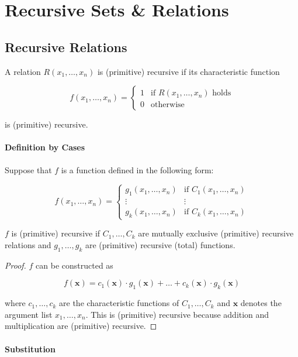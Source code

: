 \section{Recursive Sets \& Relations}

\subsection{Recursive Relations}

A relation $R(x_1, \ldots, x_n)$ is (primitive) recursive if its characteristic 
function

$$f(x_1, \ldots, x_n) = 
    \begin{cases}
        1 & \textrm{if } R(x_1, \ldots, x_n) \textrm{ holds} \\
        0 & \textrm{otherwise}
    \end{cases}
$$

is (primitive) recursive.

\paragraph{Definition by Cases}
Suppose that $f$ is a function defined in the following form:

$$f(x_1, \ldots, x_n) =
    \begin{cases}
        g_1(x_1, \ldots, x_n) & \textrm{if } C_1(x_1, \ldots, x_n) \\
        \vdots & \vdots \\
        g_k(x_1, \ldots, x_n) & \textrm{if } C_k(x_1, \ldots, x_n)
    \end{cases}
$$

$f$ is (primitive) recursive if $C_1, \ldots, C_k$ are mutually exclusive 
(primitive) recursive relations and $g_1, \ldots, g_k$ are (primitive) recursive
(total) functions. 

\begin{proof}
$f$ can be constructed as

$$f(\mathbf{x}) = c_1(\mathbf{x}) \cdot g_1(\mathbf{x}) + \ldots + 
c_k(\mathbf{x}) \cdot g_k(\mathbf{x})$$

where $c_1, \ldots, c_k$ are the characteristic functions of $C_1, \ldots, C_k$ 
and $\mathbf{x}$ denotes the argument list $x_1, \ldots, x_n$. This is 
(primitive) recursive because addition and multiplication are (primitive) 
recursive.
\end{proof}

\paragraph{Substitution}

